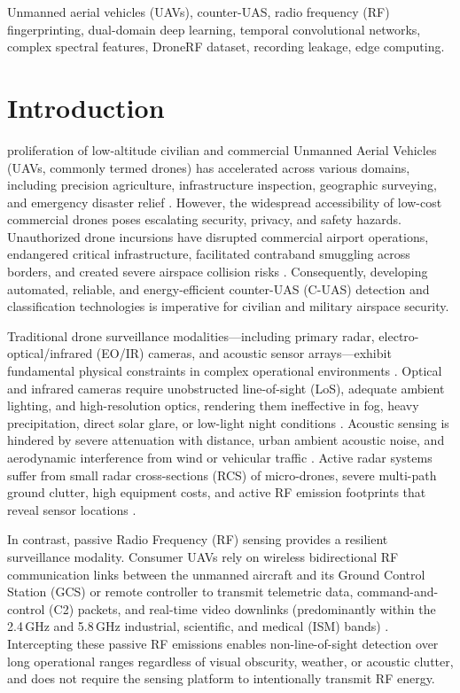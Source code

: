 \documentclass[journal,10pt,twocolumn]{IEEEtran}
\begin{document}
\begin{IEEEkeywords}
Unmanned aerial vehicles (UAVs), counter-UAS, radio frequency (RF) fingerprinting, dual-domain deep learning, temporal convolutional networks, complex spectral features, DroneRF dataset, recording leakage, edge computing.
\end{IEEEkeywords}

\section{Introduction}
 proliferation of low-altitude civilian and commercial Unmanned Aerial Vehicles (UAVs, commonly termed drones) has accelerated across various domains, including precision agriculture, infrastructure inspection, geographic surveying, and emergency disaster relief \cite{debas2024forensic, alsad2019rf}. However, the widespread accessibility of low-cost commercial drones poses escalating security, privacy, and safety hazards. Unauthorized drone incursions have disrupted commercial airport operations, endangered critical infrastructure, facilitated contraband smuggling across borders, and created severe airspace collision risks \cite{taha2019machine, debas2024forensic, sihag2023cyber4drone}. Consequently, developing automated, reliable, and energy-efficient counter-UAS (C-UAS) detection and classification technologies is imperative for civilian and military airspace security.

Traditional drone surveillance modalities---including primary radar, electro-optical/infrared (EO/IR) cameras, and acoustic sensor arrays---exhibit fundamental physical constraints in complex operational environments \cite{debas2024forensic, taha2019machine}. Optical and infrared cameras require unobstructed line-of-sight (LoS), adequate ambient lighting, and high-resolution optics, rendering them ineffective in fog, heavy precipitation, direct solar glare, or low-light night conditions \cite{ezuma2019micro}. Acoustic sensing is hindered by severe attenuation with distance, urban ambient acoustic noise, and aerodynamic interference from wind or vehicular traffic \cite{ezuma2020detection}. Active radar systems suffer from small radar cross-sections (RCS) of micro-drones, severe multi-path ground clutter, high equipment costs, and active RF emission footprints that reveal sensor locations \cite{taha2019machine}.

In contrast, passive Radio Frequency (RF) sensing provides a resilient surveillance modality. Consumer UAVs rely on wireless bidirectional RF communication links between the unmanned aircraft and its Ground Control Station (GCS) or remote controller to transmit telemetric data, command-and-control (C2) packets, and real-time video downlinks (predominantly within the 2.4\,GHz and 5.8\,GHz industrial, scientific, and medical (ISM) bands) \cite{alsad2019rf, allahham2019dronerf}. Intercepting these passive RF emissions enables non-line-of-sight detection over long operational ranges regardless of visual obscurity, weather, or acoustic clutter, and does not require the sensing platform to intentionally transmit RF energy.
\end{document}
